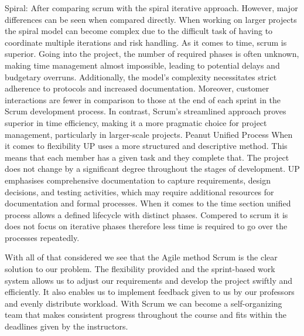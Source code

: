 \documentclass[12pt]{report}
\begin{document}
Spiral: 
After comparing scrum with the spiral iterative approach. However, major differences can be seen when compared directly.  When working on larger projects the spiral model can become complex due to the difficult task of having to coordinate multiple iterations and risk handling.  As it comes to time, scrum is superior. Going into the project, the number of required phases is often unknown, making time management almost impossible, leading to potential delays and budgetary overruns. Additionally, the model's complexity necessitates strict adherence to protocols and increased documentation. Moreover, customer interactions are fewer in comparison to those at the end of each sprint in the Scrum development process. In contrast, Scrum's streamlined approach proves superior in time efficiency, making it a more pragmatic choice for project management, particularly in larger-scale projects.
Peanut
Unified Process
When it comes to flexibility UP uses a more structured and descriptive method. This means that each member has a given task and they complete that. The project does not change by a significant degree throughout the stages of development. UP emphasises comprehensive documentation to capture requirements, design decisions, and testing activities, which may require additional resources for documentation and formal processes.
When it comes to the time section unified process allows a defined lifecycle with distinct phases. Compered to scrum it is does not focus on iterative phases therefore less time is required to go over the processes repeatedly.

With all of that considered we see that the Agile method Scrum is the clear solution to our problem. The flexibility provided and the sprint-based work system allows us to adjust our requirements and develop the project swiftly and efficiently. It also enables us to implement feedback given to us by our professors and evenly distribute workload. With Scrum we can become a self-organizing team that makes consistent progress throughout the course and fits within the deadlines given by the instructors. 
\end{document}

